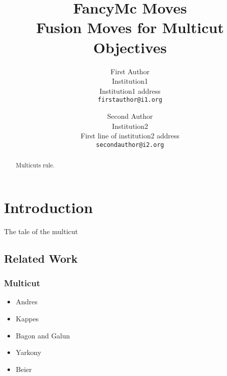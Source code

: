 \documentclass[10pt,twocolumn,letterpaper]{article}
\begin{document}

\title{FancyMc Moves \\ Fusion Moves for Multicut Objectives}

\author{First Author\\
Institution1\\
Institution1 address\\
{\tt\small firstauthor@i1.org}
\and
Second Author\\
Institution2\\
First line of institution2 address\\
{\tt\small secondauthor@i2.org}
}

\maketitle

\begin{abstract}
   Multicuts rule.
\end{abstract}
\section{Introduction}

The tale of the multicut


\subsection{Related Work}

\subsubsection{Multicut}
   \begin{itemize}
   \item Andres \etal~\cite{andres_2011_iccv}
   \item Kappes \etal~\cite{kappes_2011_emmcvpr}
   \item Bagon and Galun~\cite{bagon_2011_arxiv}
   \item Yarkony \etal~\cite{yarkony_2012_eccv}
   \item Beier \etal~\cite{beier_2014_cvpr}
   \end{itemize}
\end{document}
